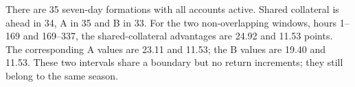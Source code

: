 There are 35 seven-day formations with all accounts active.
Shared collateral is ahead in 34, A in
35 and B in 33.
For the two non-overlapping windows, hours 1--169 and 169--337,
the shared-collateral advantages are 24.92 and
11.53 points. The corresponding A values are
23.11 and 11.53;
the B values are 19.40 and
11.53. These two intervals share a
boundary but no return increments; they still belong to the same season.
